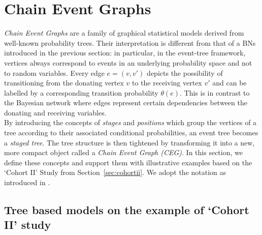 \documentclass[runningheads]{llncs}
\begin{document}
\section{Chain Event Graphs}\label{sec:cegs}
\emph{Chain Event Graphs} are a family of graphical statistical models derived from well-known probability trees. Their interpretation is different from that of a BNs introduced in the previous section: in particular, in the event-tree framework, vertices always correspond to events in an underlying probability space and not to random variables. Every edge $e = (v, v')$ depicts the possibility of transitioning from the donating vertex $v$ to the receiving vertex $v'$ and can be labelled by a corresponding transition probability $\theta(e)$. This is in contrast to the Bayesian network where edges represent certain dependencies between the donating and receiving variables. \\
By introducing the concepts of \emph{stages} and \emph{positions} which group the vertices of a tree according to their associated conditional probabilities, an event tree becomes a \emph{staged tree}. The tree structure is then tightened by transforming it into a new, more compact object called a \emph{Chain Event Graph (CEG)}. In this section, we define these concepts and support them with illustrative examples based on the `Cohort II' Study from Section~\ref{sec:cohortii}. We adopt the notation as introduced in \cite{smith2017cegs}. 

\subsection{Tree based models on the example of `Cohort II' study}\label{subsec:treemodels}
\end{document}
